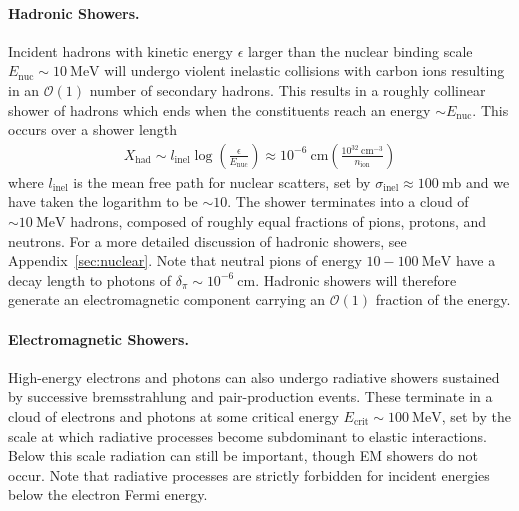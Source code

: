 \documentclass[twocolumn, preprintnumbers,amsmath,amssymb,prd, superscriptaddress]{revtex4}
\newcommand{\OO}{\mathcal{O}}
\newcommand{\MeV}{\text{MeV}}
\def\r{\right)}
\def\l{\left(}
\begin{document}
\paragraph{Hadronic Showers.}
Incident hadrons with kinetic energy $\epsilon$ larger than the nuclear binding scale $E_\text{nuc} \sim 10~\MeV$ will undergo violent inelastic collisions with carbon ions resulting in an $\OO(1)$ number of secondary hadrons.
This results in a roughly collinear shower of hadrons which ends when the constituents reach an energy $\sim E_\text{nuc}$.
This occurs over a shower length
\begin{align}
\label{eq:hadlength}
  X_\text{had} \sim l_\text{inel} \log\l\frac{\epsilon}{E_\text{nuc}}\r
  \approx 10^{-6} ~\text{cm} \l\frac{10^{32}~\text{cm}^{-3}}{n_\text{ion}}\r
\end{align}
where $l_\text{inel}$ is the mean free path for nuclear scatters, set by $\sigma_\text{inel} \approx 100 ~\text{mb}$ and we have taken the logarithm to be $\sim 10$. 
The shower terminates into a cloud of $\sim 10~\MeV$ hadrons, composed of roughly equal fractions of pions, protons, and neutrons.
For a more detailed discussion of hadronic showers, see Appendix~\ref{sec:nuclear}.
Note that neutral pions of energy $10 - 100 ~\text{MeV}$ have a decay length to photons of $\delta_\pi \sim 10^{-6} ~\text{cm}$.
Hadronic showers will therefore generate an electromagnetic component carrying an $\OO(1)$ fraction of the energy.

\paragraph{Electromagnetic Showers.}
High-energy electrons and photons can also undergo radiative showers sustained by successive bremsstrahlung and pair-production events.
These terminate in a cloud of electrons and photons at some critical energy $E_\text{crit} \sim 100~\MeV$, set by the scale at which radiative processes become subdominant to elastic interactions.
Below this scale radiation can still be important, though EM showers do not occur. 
Note that radiative processes are strictly forbidden for incident energies below the electron Fermi energy.
\end{document}
